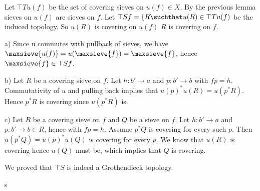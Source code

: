 \begin{definition}
Let $\top{T}{u(f)}$ be the set of covering sieves on $u(f) \in X$.
By the previous lemma sieves on $u(f)$ are sieves on $f$.
Let $\top{S}{f} = \{R \suchthat u(R) \in \top{T}{u(f)}$ be the induced topology.
So $u(R)$ is covering on $u(f)$ \iff $R$ is covering on $f$.

a) Since u commutes with pullback of sieves, 
we have $\maxsieve{u(f)} = u(\maxsieve{f}) = \maxsieve{f}$,
hence $\maxsieve{f} \in \top{S}{f}$.

b) Let $R$ be a covering sieve on $f$.
Let $h:b'\rightarrow a$
and $p:b' \rightarrow b$ with $fp = h$.
Commutativity of $u$ and pulling back implies that $u(p)^*u(R) = u(p^*R)$.
Hence $p^*R$ is covering since $u(p^*R)$ is.

c) Let $R$ be a covering sieve on $f$
and $Q$ be a sieve on $f$.
Let $h:b'\rightarrow a$
and $p:b' \rightarrow b \in R$,
hence with $fp = h$.
Assume $p^*Q$ is covering for every such $p$.
Then $u(p^*Q) = u(p)^*u(Q)$ is covering for every $p$.
We know that $u(R)$ is covering hence $u(Q)$ must be, which implies that $Q$ is covering.

We proved that $\top{S}$ is indeed a Grothendieck topology.
\end{definition}s